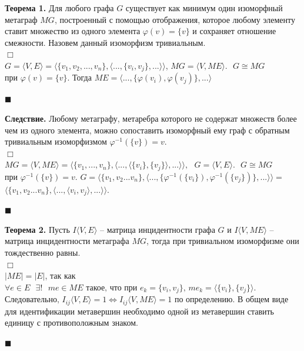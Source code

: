 
\textbf{Теорема 1.} Для любого графа $G$ существует как минимум один изоморфный метаграф $MG$, построенный с помощью отображения, которое любому элементу ставит множество из одного элемента $\varphi(v) = \{v\}$ и сохраняет отношение смежности. Назовем данный изоморфизм тривиальным.
\\$\Box$\\
$G=\langle V,E \rangle=\Big \langle\{v_1,v_2,...,v_n \},\big\langle ..., \{ v_i, v_j \}, ... \big\rangle \Big\rangle$, $ MG=\langle V,ME \rangle. \text{ } G \cong MG $\\$ \text{при } \varphi(v) = \{v\}$. $\text{Тогда 	} ME=\big\langle ..., \{ \varphi(v_i), \varphi(v_j) \}, ... \big\rangle$
\vspace{-0.6cm}
\begin{flushright}
$\blacksquare$
\end{flushright}
\vspace{-0.6cm}

\textbf{Следствие.} Любому метаграфу, метаребра которого не содержат множеств более чем из одного элемента, можно сопоставить изоморфный ему граф с обратным тривиальным изоморфизмом $\varphi^{-1}(\{ v \}) = v$.
\\$\Box$\\
 $MG=\langle V,ME \rangle = \Big\langle \{ v_1,...,v_n \},\big\langle ..., \langle \{v_i\}, \{v_j\} \rangle, ... \big\rangle \Big \rangle, \text{ }G = \langle V,E \rangle. \text{ } G \cong MG $\\$ \text{при } \varphi^{-1}(\{ v \}) = v$. $G=\Big \langle\{v_1,v_2...v_n \},\big\langle ..., \{ \varphi^{-1}(\{v_i\}), \varphi^{-1}(\{v_j\}) \}, ... \big\rangle \Big\rangle=$\\$\Big \langle\{v_1,v_2...v_n \},\big\langle ..., \langle v_i, v_j \rangle, ... \big\rangle \Big\rangle$.
 \vspace{-0.6cm}
\begin{flushright}
$\blacksquare$
\end{flushright}
\vspace{-0.6cm}

\textbf{Теорема 2.} Пусть $I\langle V,E\rangle$ -- матрица инцидентности графа $G$ и $I\langle V, ME \rangle$ -- матрица инцидентности метаграфа $MG$, тогда при тривиальном изоморфизме они тождественно равны.
\\$\Box$\\
$|ME|=|E|$, так как $\forall e \in E \text{ } \exists! \text{ }me \in ME \text{ такое, что при } e_k = \{v_i,v_j\} \text{, } me_k = \langle \{v_i\},\{v_j\} \rangle$. $\text{Следовательно, } I_{ij}\langle V, E \rangle = 1 \Leftrightarrow I_{ij}\langle V, ME \rangle=1 \text{ по определению.}$ В общем виде для идентификации метавершин необходимо одной из метавершин ставить единицу с противоположным знаком.
 \vspace{-0.6cm}
\begin{flushright}
$\blacksquare$
\end{flushright}
\vspace{-0.6cm}

